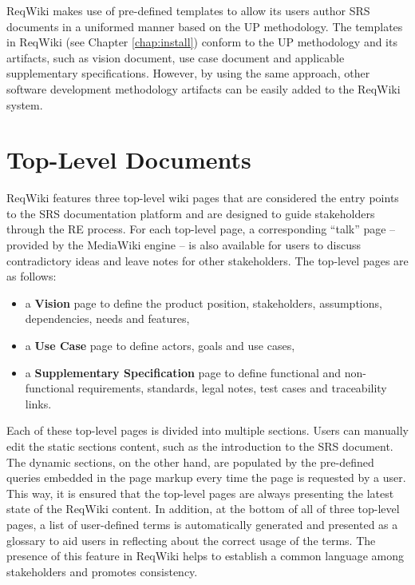 \documentclass[10pt,twoside,openany,bibtotoc,liststotoc]{scrbook}
\begin{document}
ReqWiki makes use of pre-defined templates to allow its users author SRS documents in a uniformed manner based on the UP methodology. The templates in ReqWiki (see Chapter \ref{chap:install}) conform to the UP methodology and its artifacts, such as vision document, use case document and applicable supplementary specifications. However, by using the same approach, other software development methodology artifacts can be easily added to the ReqWiki system. 

\section{Top-Level Documents}
ReqWiki features three top-level wiki pages that are considered the entry points to the SRS documentation platform and are designed to guide stakeholders through the RE process. For each top-level page, a corresponding ``talk'' page -- provided by the MediaWiki engine -- is also available for users to discuss contradictory ideas and leave notes for other stakeholders. The top-level pages are as follows:

\begin{itemize}
\item a \textbf{Vision} page to define the product position, stakeholders, assumptions, dependencies, needs and features,
\item a \textbf{Use Case} page to define actors, goals and use cases,
\item a \textbf{Supplementary Specification} page to define functional and non-functional requirements, standards, legal notes, test cases and traceability links.
\end{itemize}

Each of these top-level pages is divided into multiple sections. Users can manually edit the static sections content, such as the introduction to the SRS document. The dynamic sections, on the other hand, are populated by the pre-defined queries embedded in the page markup every time the page is requested by a user. This way, it is ensured that the top-level pages are always presenting the latest state of the ReqWiki content.  In addition, at the bottom of all of three top-level pages, a list of user-defined terms is automatically generated and presented as a glossary to aid users in reflecting about the correct usage of the terms. The presence of this feature in ReqWiki helps to establish a common language among stakeholders and promotes consistency.
\end{document}

